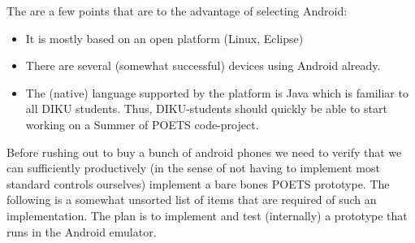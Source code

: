 \documentclass[envcountsame]{llncs}
\begin{document}
The are a few points that are to the advantage of selecting Android:

\begin{itemize}
\item It is mostly based on an open platform (Linux, Eclipse)
\item There are several (somewhat successful) devices using Android
  already.
\item The (native) language supported by the platform is Java which is
  familiar to all DIKU students. Thus, DIKU-students should quickly be
  able to start working on a Summer of POETS code-project.
\end{itemize}

Before rushing out to buy a bunch of android phones we need to verify
that we can sufficiently productively (in the sense of not having to
implement most standard controls ourselves) implement a bare bones
POETS prototype. The following is a somewhat unsorted list of items
that are required of such an implementation. The plan is to implement
and test (internally) a prototype that runs in the Android emulator.
\end{document}
